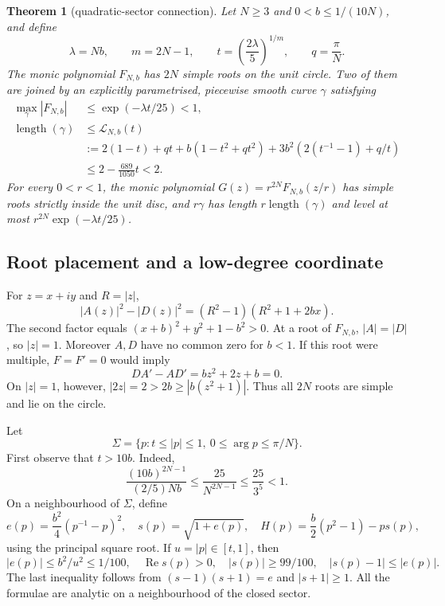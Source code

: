 \documentclass[11pt,a4paper]{article}
\newtheorem{theorem}{Theorem}[section]
\theoremstyle{remark}\newtheorem{remark}[theorem]{Remark}
\newcommand{\length}{\operatorname{length}}
\newcommand{\Rea}{\operatorname{Re}}
\begin{document}
\begin{theorem}[quadratic-sector connection]\label{thm:sector}
Let $N\ge3$ and $0<b\le1/(10N)$, and define
\[
 \lambda=Nb,\qquad m=2N-1,\qquad
 t=\left(\frac{2\lambda}{5}\right)^{1/m},\qquad q=\frac\pi N.
\]
The monic polynomial $F_{N,b}$ has $2N$ simple roots on the unit circle.
Two of them are joined by an explicitly parametrised, piecewise smooth
curve $\gamma$ satisfying
\begin{align}
 \max_\gamma |F_{N,b}|&\le \exp(-\lambda t/25)<1,\label{eq:collar}\\
 \length(\gamma)&\le\mathcal L_{N,b}(t)\nonumber\\
 &:=2(1-t)+qt
    +b(1-t^2+qt^2)
    +3b^2\left(2(t^{-1}-1)+q/t\right)\label{eq:exactlength}\\
 &\le2-\frac{689}{1050}t<2.\label{eq:uniformlength}
\end{align}
For every $0<r<1$, the monic polynomial
$G(z)=r^{2N}F_{N,b}(z/r)$ has simple roots strictly inside the unit disc,
and $r\gamma$ has length $r\length(\gamma)$ and level at most
$r^{2N}\exp(-\lambda t/25)$.
\end{theorem}

\subsection{Root placement and a low-degree coordinate}

For $z=x+iy$ and $R=|z|$,
\begin{equation}\label{eq:normdefect}
 |A(z)|^2-|D(z)|^2
 =(R^2-1)(R^2+1+2bx).
\end{equation}
The second factor equals $(x+b)^2+y^2+1-b^2>0$.
At a root of $F_{N,b}$, $|A|=|D|$, so $|z|=1$.
Moreover $A,D$ have no common zero for $b<1$.
If this root were multiple, $F=F'=0$ would imply
\[
 DA'-AD'=bz^2+2z+b=0.
\]
On $|z|=1$, however, $|2z|=2>2b\ge|b(z^2+1)|$.
Thus all $2N$ roots are simple and lie on the circle.

Let
\[
 \Sigma=\{p:t\le|p|\le1,\ 0\le\arg p\le\pi/N\}.
\]
First observe that $t>10b$. Indeed,
\[
 \frac{(10b)^{2N-1}}{(2/5)Nb}
 \le\frac{25}{N^{2N-1}}\le\frac{25}{3^5}<1.
\]
On a neighbourhood of $\Sigma$, define
\begin{equation}\label{eq:H}
 e(p)=\frac{b^2}{4}(p^{-1}-p)^2,\quad
 s(p)=\sqrt{1+e(p)},\quad
 H(p)=\frac b2(p^2-1)-ps(p),
\end{equation}
using the principal square root. If $u=|p|\in[t,1]$, then
\begin{equation}\label{eq:small-e}
 |e(p)|\le b^2/u^2\le1/100,\quad
 \Rea s(p)>0,\quad |s(p)|\ge99/100,\quad
 |s(p)-1|\le|e(p)|.
\end{equation}
The last inequality follows from $(s-1)(s+1)=e$ and $|s+1|\ge1$.
All the formulae are analytic on a neighbourhood of the closed sector.
\end{document}
